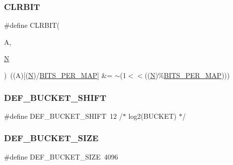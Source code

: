 \subsubsection{\texorpdfstring{CLRBIT}{CLRBIT}}
{\footnotesize\ttfamily \#define C\+L\+R\+B\+IT(\begin{DoxyParamCaption}\item[{}]{A,  }\item[{}]{\mbox{\hyperlink{adat__devel_2lib_2hadron_2operator__name__util_8cc_a7722c8ecbb62d99aee7ce68b1752f337}{N}} }\end{DoxyParamCaption})~((A)\mbox{[}(\mbox{\hyperlink{adat__devel_2lib_2hadron_2operator__name__util_8cc_a7722c8ecbb62d99aee7ce68b1752f337}{N}})/\mbox{\hyperlink{adat__devel_2other__libs_2filedb_2filehash_2ffdb__hash_8h_a706555145b7398c440b139f6394d6cfc}{B\+I\+T\+S\+\_\+\+P\+E\+R\+\_\+\+M\+AP}}\mbox{]} \&= $\sim$(1$<$$<$((\mbox{\hyperlink{adat__devel_2lib_2hadron_2operator__name__util_8cc_a7722c8ecbb62d99aee7ce68b1752f337}{N}})\%\mbox{\hyperlink{adat__devel_2other__libs_2filedb_2filehash_2ffdb__hash_8h_a706555145b7398c440b139f6394d6cfc}{B\+I\+T\+S\+\_\+\+P\+E\+R\+\_\+\+M\+AP}})))}

\mbox{\label{adat-devel_2other__libs_2filedb_2filehash_2ffdb__hash_8h_a94d649e1a4b4875af299406d00d90179}} 
\subsubsection{\texorpdfstring{DEF\_BUCKET\_SHIFT}{DEF\_BUCKET\_SHIFT}}
{\footnotesize\ttfamily \#define D\+E\+F\+\_\+\+B\+U\+C\+K\+E\+T\+\_\+\+S\+H\+I\+FT~12		/$\ast$ log2(B\+U\+C\+K\+ET) $\ast$/}

\mbox{\label{adat-devel_2other__libs_2filedb_2filehash_2ffdb__hash_8h_a2870136687576cbb7437954d829032f5}} 
\subsubsection{\texorpdfstring{DEF\_BUCKET\_SIZE}{DEF\_BUCKET\_SIZE}}
{\footnotesize\ttfamily \#define D\+E\+F\+\_\+\+B\+U\+C\+K\+E\+T\+\_\+\+S\+I\+ZE~4096}

